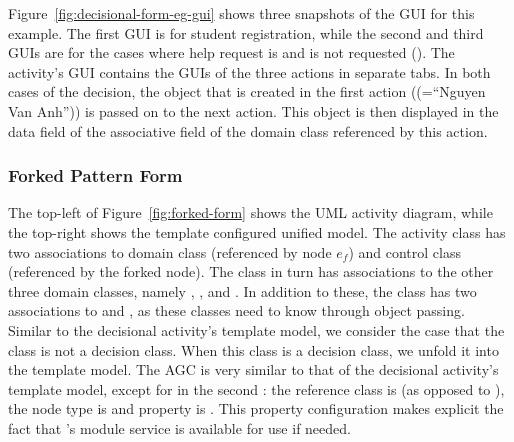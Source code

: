 Figure~\ref{fig:decisional-form-eg-gui} shows three snapshots of the GUI for this example. The first GUI is for student registration, while the second and third GUIs are for the cases where help request is and is not requested (\resp). The activity's GUI contains the GUIs of the three actions in separate tabs. In both cases of the decision, the  object that is created in the first action (\eg {}(=``Nguyen Van Anh'')) is passed on to the next action. This object is then displayed in the data field of the associative field  of the domain class referenced by this action.

\subsubsection{Forked Pattern Form} \label{sect:forked-pattern}
The top-left of Figure~\ref{fig:forked-form} shows the UML activity diagram, while the top-right shows the template configured unified model. The activity class  has two associations to domain class  (referenced by node $ e_f $) and control class  (referenced by the forked node). The class  in turn has associations to the other three domain classes, namely , , and . In addition to these, the class  has two associations to  and , as these classes need to know  through object passing.
%
Similar to the decisional activity's template model, we consider the case that the class  is not a decision class. When this class is a decision class, we unfold it into the template model.
%
The AGC is very similar to that of the decisional activity's template model, except for in the second : the reference class is  (as opposed to ), the node type is  and property  is . This property configuration makes explicit the fact that 's module service is available for use if needed.

